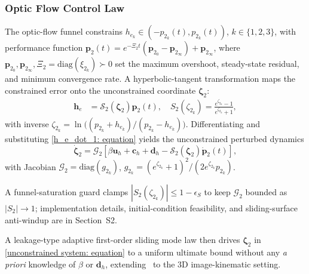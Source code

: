 \subsubsection{Optic Flow Control Law} \label{ppc optic flow: section}
The optic-flow funnel constrains $h_{e_k}\in(-p_{2_k}(t),p_{2_k}(t))$, $k\in\{1,2,3\}$, with performance function $\boldsymbol{p}_2(t) = e^{-\Xi_2 t}(\boldsymbol{p}_{2_0}-\boldsymbol{p}_{2_\infty})+\boldsymbol{p}_{2_\infty}$, where $\boldsymbol{p}_{2_0},\boldsymbol{p}_{2_\infty},\Xi_2=\text{diag}(\xi_{2_k})\succ 0$ set the maximum overshoot, steady-state residual, and minimum convergence rate. A hyperbolic-tangent transformation maps the constrained error onto the unconstrained coordinate $\boldsymbol{\zeta}_2$:
\begin{align}
    \label{optical flow error transformation: equation}
    \boldsymbol{h}_e &= \mathcal{S}_2(\boldsymbol{\zeta}_2)\boldsymbol{p}_2(t),\quad S_2(\zeta_{2_k}) = \frac{e^{\zeta_{2_k}}-1}{e^{\zeta_{2_k}}+1},
\end{align}
with inverse $\zeta_{2_k}=\ln\!\big((p_{2_k}+h_{e_k})/(p_{2_k}-h_{e_k})\big)$. Differentiating and substituting \eqref{h_e_dot_1: equation} yields the unconstrained perturbed dynamics
\begin{equation} \label{unconstrained system: equation}
    \dot{\boldsymbol{\zeta}}_2 = \mathcal{G}_2\!\left[\beta\boldsymbol{u}_h + \boldsymbol{c}_h + \boldsymbol{d}_h - \mathcal{S}_2(\boldsymbol{\zeta}_2)\dot{\boldsymbol{p}}_2(t)\right],
\end{equation}
with Jacobian $\mathcal{G}_2=\text{diag}(g_{2_k})$, $g_{2_k}=(e^{\zeta_{2_k}}+1)^2/(2e^{\zeta_{2_k}}p_{2_k})$.

A funnel-saturation guard clamps $|S_2(\zeta_{2_k})|\le 1-\epsilon_S$ to keep $\mathcal{G}_2$ bounded as $|S_2|\to 1$; implementation details, initial-condition feasibility, and sliding-surface anti-windup are in Section~S2.

A leakage-type adaptive first-order sliding mode law then drives $\boldsymbol{\zeta}_2$ in \eqref{unconstrained system: equation} to a uniform ultimate bound without any \emph{a priori} knowledge of $\beta$ or $\boldsymbol{d}_h$, extending~\cite{singhal2025} to the 3D image-kinematic setting.

